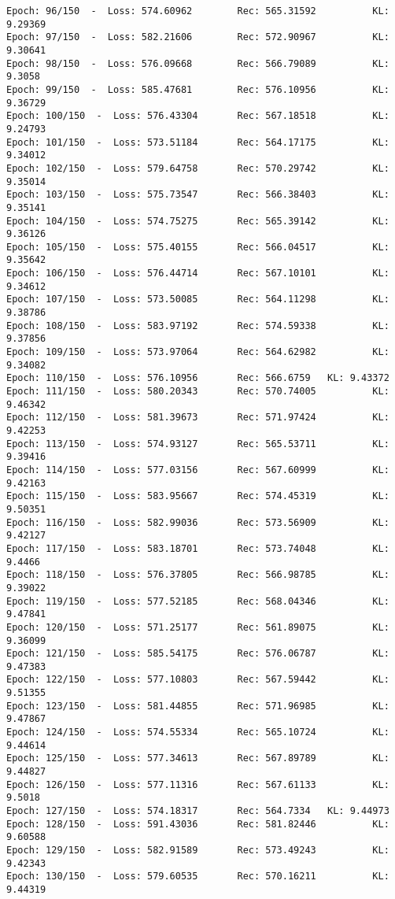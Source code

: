 \documentclass[11pt]{article}
\begin{document}
\begin{Verbatim}[commandchars=\\\{\}]
Epoch: 96/150  -  Loss: 574.60962        Rec: 565.31592          KL: 9.29369
Epoch: 97/150  -  Loss: 582.21606        Rec: 572.90967          KL: 9.30641
Epoch: 98/150  -  Loss: 576.09668        Rec: 566.79089          KL: 9.3058
Epoch: 99/150  -  Loss: 585.47681        Rec: 576.10956          KL: 9.36729
Epoch: 100/150  -  Loss: 576.43304       Rec: 567.18518          KL: 9.24793
Epoch: 101/150  -  Loss: 573.51184       Rec: 564.17175          KL: 9.34012
Epoch: 102/150  -  Loss: 579.64758       Rec: 570.29742          KL: 9.35014
Epoch: 103/150  -  Loss: 575.73547       Rec: 566.38403          KL: 9.35141
Epoch: 104/150  -  Loss: 574.75275       Rec: 565.39142          KL: 9.36126
Epoch: 105/150  -  Loss: 575.40155       Rec: 566.04517          KL: 9.35642
Epoch: 106/150  -  Loss: 576.44714       Rec: 567.10101          KL: 9.34612
Epoch: 107/150  -  Loss: 573.50085       Rec: 564.11298          KL: 9.38786
Epoch: 108/150  -  Loss: 583.97192       Rec: 574.59338          KL: 9.37856
Epoch: 109/150  -  Loss: 573.97064       Rec: 564.62982          KL: 9.34082
Epoch: 110/150  -  Loss: 576.10956       Rec: 566.6759   KL: 9.43372
Epoch: 111/150  -  Loss: 580.20343       Rec: 570.74005          KL: 9.46342
Epoch: 112/150  -  Loss: 581.39673       Rec: 571.97424          KL: 9.42253
Epoch: 113/150  -  Loss: 574.93127       Rec: 565.53711          KL: 9.39416
Epoch: 114/150  -  Loss: 577.03156       Rec: 567.60999          KL: 9.42163
Epoch: 115/150  -  Loss: 583.95667       Rec: 574.45319          KL: 9.50351
Epoch: 116/150  -  Loss: 582.99036       Rec: 573.56909          KL: 9.42127
Epoch: 117/150  -  Loss: 583.18701       Rec: 573.74048          KL: 9.4466
Epoch: 118/150  -  Loss: 576.37805       Rec: 566.98785          KL: 9.39022
Epoch: 119/150  -  Loss: 577.52185       Rec: 568.04346          KL: 9.47841
Epoch: 120/150  -  Loss: 571.25177       Rec: 561.89075          KL: 9.36099
Epoch: 121/150  -  Loss: 585.54175       Rec: 576.06787          KL: 9.47383
Epoch: 122/150  -  Loss: 577.10803       Rec: 567.59442          KL: 9.51355
Epoch: 123/150  -  Loss: 581.44855       Rec: 571.96985          KL: 9.47867
Epoch: 124/150  -  Loss: 574.55334       Rec: 565.10724          KL: 9.44614
Epoch: 125/150  -  Loss: 577.34613       Rec: 567.89789          KL: 9.44827
Epoch: 126/150  -  Loss: 577.11316       Rec: 567.61133          KL: 9.5018
Epoch: 127/150  -  Loss: 574.18317       Rec: 564.7334   KL: 9.44973
Epoch: 128/150  -  Loss: 591.43036       Rec: 581.82446          KL: 9.60588
Epoch: 129/150  -  Loss: 582.91589       Rec: 573.49243          KL: 9.42343
Epoch: 130/150  -  Loss: 579.60535       Rec: 570.16211          KL: 9.44319

\end{Verbatim}
\end{document}
